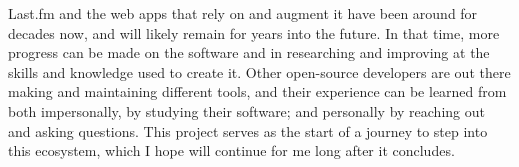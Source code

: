 Last.fm and the web apps that rely on and augment it have been around for decades now, and will likely remain for years into the future. In that time, more progress can be made on the software and in researching and improving at the skills and knowledge used to create it. Other open-source developers are out there making and maintaining different tools, and their experience can be learned from both impersonally, by studying their software; and personally by reaching out and asking questions. This project serves as the start of a journey to step into this ecosystem, which I hope will continue for me long after it concludes.